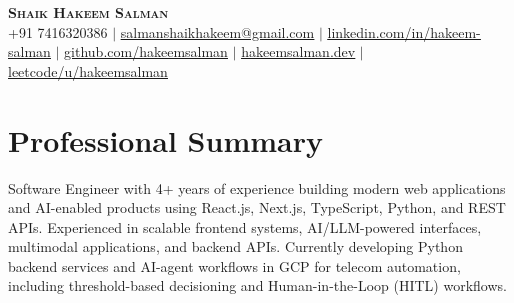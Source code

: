 \documentclass[letterpaper,11pt]{article}
\begin{document}

\begin{center}
    \textbf{\Huge \scshape Shaik Hakeem Salman} \\ \vspace{1pt}
    \small +91 7416320386 $|$ \href{mailto:salmanshaikhakeem@gmail.com}{\underline{salmanshaikhakeem@gmail.com}} $|$ 
    \href{https://linkedin.com/in/hakeem-salman}{\underline{linkedin.com/in/hakeem-salman}} $|$
    \href{https://github.com/hakeemsalman}{\underline{github.com/hakeemsalman}}
    $|$ \href{https://hakeemsalman.dev}{\underline{hakeemsalman.dev}}
    $|$ \href{https://leetcode.com/u/hakeemsalman/}{\underline{leetcode/u/hakeemsalman}}
\end{center}


\section{Professional Summary}
\begin{itemize}[leftmargin=0.15in, label={}]
\small{\item{
Software Engineer with 4+ years of experience building modern web applications and AI-enabled products using React.js, Next.js, TypeScript, Python, and REST APIs. Experienced in scalable frontend systems, AI/LLM-powered interfaces, multimodal applications, and backend APIs. Currently developing Python backend services and AI-agent workflows in GCP for telecom automation, including threshold-based decisioning and Human-in-the-Loop (HITL) workflows.
}}
\end{itemize}


\end{document}
